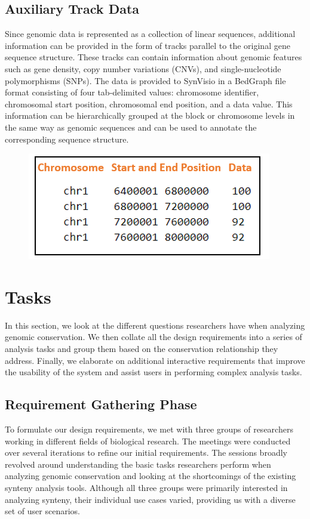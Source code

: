 \subsection{Auxiliary Track Data}
Since genomic data is represented as a collection of linear sequences, additional information can be provided in the form of tracks parallel to the original gene sequence structure. These tracks can contain information about genomic features such as gene density, copy number variations (CNVs), and single-nucleotide polymorphisms (SNPs). The data is provided to SynVisio in a BedGraph file format consisting of four tab-delimited values: chromosome identifier, chromosomal start position, chromosomal end position, and a data value. This information can be hierarchically grouped at the block or chromosome levels in the same way as genomic sequences and can be used to annotate the corresponding sequence structure. 

\begin{figure}
  \centering
  \includegraphics[width=.45\linewidth]{images/ch_3_track_file.PNG}
  \label{fig:ch_3_track_file}
\end{figure}

\section{Tasks}

In this section, we look at the different questions researchers have when analyzing genomic conservation. We then collate all the design requirements into a series of analysis tasks and group them based on the conservation relationship they address. Finally, we elaborate on additional interactive requirements that improve the usability of the system and assist users in performing complex analysis tasks.

\subsection{Requirement Gathering Phase}
To formulate our design requirements, we met with three groups of researchers working in different fields of biological research. The meetings were conducted over several iterations to refine our initial requirements. The sessions broadly revolved around understanding the basic tasks researchers perform when analyzing genomic conservation and looking at the shortcomings of the existing synteny analysis tools. Although all three groups were primarily interested in analyzing synteny, their individual use cases varied, providing us with a diverse set of user scenarios.

